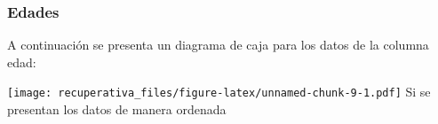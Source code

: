 \documentclass[
  spanish,
]{article}
\newenvironment{Shaded}{\begin{snugshade}}{\end{snugshade}}
\newcommand{\DataTypeTok}[1]{\textcolor[rgb]{0.13,0.29,0.53}{#1}}
\newcommand{\KeywordTok}[1]{\textcolor[rgb]{0.13,0.29,0.53}{\textbf{#1}}}
\newcommand{\NormalTok}[1]{#1}
\newcommand{\OperatorTok}[1]{\textcolor[rgb]{0.81,0.36,0.00}{\textbf{#1}}}
\newcommand{\OtherTok}[1]{\textcolor[rgb]{0.56,0.35,0.01}{#1}}
\newcommand{\StringTok}[1]{\textcolor[rgb]{0.31,0.60,0.02}{#1}}
\begin{document}
\hypertarget{edades}{%
\subsubsection{Edades}\label{edades}}

A continuación se presenta un diagrama de caja para los datos de la
columna edad:

\begin{Shaded}
\end{Shaded}

\texttt{[image: recuperativa\_files/figure-latex/unnamed-chunk-9-1.pdf]}
Si se presentan los datos de manera ordenada

\begin{Shaded}
\end{Shaded}
\end{document}
